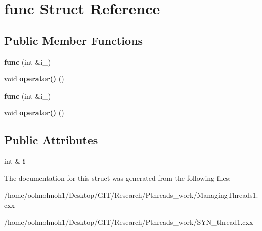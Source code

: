 \hypertarget{structfunc}{}\section{func Struct Reference}
\label{structfunc}
\subsection*{Public Member Functions}
\begin{DoxyCompactItemize}
\item 
\mbox{\label{structfunc_a6801d59dec3f95f3f7e2d9505212f144}} 
{\bfseries func} (int \&i\+\_\+)
\item 
\mbox{\label{structfunc_ae6878437e9e8405fe4f96dd798ef835d}} 
void {\bfseries operator()} ()
\item 
\mbox{\label{structfunc_a6801d59dec3f95f3f7e2d9505212f144}} 
{\bfseries func} (int \&i\+\_\+)
\item 
\mbox{\label{structfunc_ae6878437e9e8405fe4f96dd798ef835d}} 
void {\bfseries operator()} ()
\end{DoxyCompactItemize}
\subsection*{Public Attributes}
\begin{DoxyCompactItemize}
\item 
\mbox{\label{structfunc_af3b5e33f274c8e00a4e44cb5893e0f47}} 
int \& {\bfseries i}
\end{DoxyCompactItemize}


The documentation for this struct was generated from the following files\+:\begin{DoxyCompactItemize}
\item 
/home/oohnohnoh1/\+Desktop/\+G\+I\+T/\+Research/\+Pthreads\+\_\+work/Managing\+Threads1.\+cxx\item 
/home/oohnohnoh1/\+Desktop/\+G\+I\+T/\+Research/\+Pthreads\+\_\+work/S\+Y\+N\+\_\+thread1.\+cxx\end{DoxyCompactItemize}
